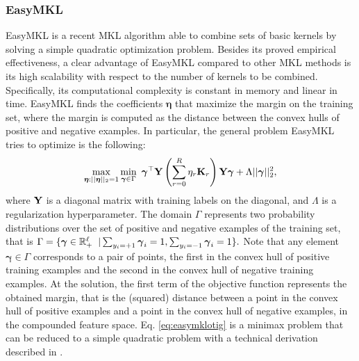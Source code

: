 \documentclass{esannV2}
\newcommand{\Real}{\mathbb{R}}
\newcommand{\KK}{{\bf K}}
\newcommand{\YY}{{\bf Y}}
\newcommand{\1}{{\bf 1}}
\newcommand{\ggamma}{\pmb{\gamma}}
\begin{document}
\subsubsection{EasyMKL}
\label{EasyMKL}
EasyMKL \cite{Aiolli2015} is a recent MKL algorithm able to combine sets of basic kernels by solving a simple quadratic optimization problem. Besides its proved empirical effectiveness, a clear advantage of EasyMKL compared to other MKL methods is its high scalability with respect to the number of kernels to be combined. Specifically, its computational complexity is constant in memory and linear in time.
EasyMKL finds the coefficients $\boldsymbol{\eta}$ that maximize the margin on the training set, where the margin is computed as the distance between the convex hulls of positive and negative examples. In particular, the general problem EasyMKL tries to optimize is the following:
\vspace{-0.4cm}
\begin{equation}
\label{eq:easymklotig}
\max_{\boldsymbol{\eta}:||\boldsymbol{\eta}||_2=1} \min_{\boldsymbol{\gamma} \in \Gamma} \mbox { }  \boldsymbol{\gamma}^{\top} \YY \left( \sum_{r=0}^R \eta_r \KK_r\right) \YY \boldsymbol{\gamma} + \Lambda ||\boldsymbol{\gamma}||^2_2,
\end{equation}
where $\YY$ is a diagonal matrix with training labels on the diagonal, and $\Lambda$ is a regularization hyperparameter. The domain $\Gamma$ represents two probability distributions over the set of positive and negative examples of the training set, that is $\Gamma = \{\boldsymbol{\gamma} \in \Real_+^{\ell} \hspace{0.2cm} |  \sum_{y_i = +1} \boldsymbol{\gamma}_i = 1 , \sum_{y_i = -1} \boldsymbol{\gamma}_i = 1\}.
$
Note that any element $\boldsymbol{\gamma} \in \Gamma$ corresponds to a pair of points, the first in the convex hull of positive training examples and the second in the convex hull of negative training examples.
At the solution, the first term of the objective function represents the obtained margin, that is the (squared) distance between a point in the convex hull of positive examples and a point in the convex hull of negative examples, in the compounded feature space.
Eq. \ref{eq:easymklotig} is a minimax problem that can be reduced  to a simple quadratic problem with a technical derivation described  in \cite{Aiolli2015}. %
\end{document}
